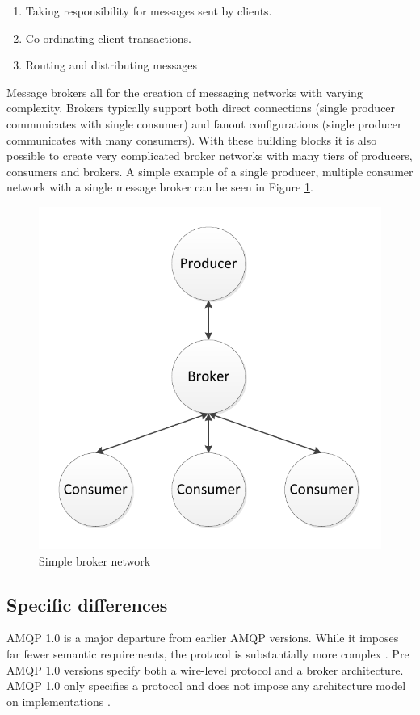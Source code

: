 \documentclass{thesis}
\begin{document}
\begin{enumerate}
\item Taking responsibility for messages sent by clients.
\item Co-ordinating client transactions.
\item Routing and distributing messages 
\end{enumerate}

Message brokers all for the creation of messaging networks with varying complexity.  Brokers typically support both direct connections (single producer communicates with single consumer) and fanout configurations (single producer communicates with many consumers).  With these building blocks it is also possible to create very complicated broker networks with many tiers of producers, consumers and brokers.  A simple example of a single producer, multiple consumer network with a single message broker can be seen in Figure \ref{fig:simple-fanout}.

\begin{figure}[ht]
\centering
\includegraphics[scale=.75]{simple_fanout}  
\caption{Simple broker network}
\label{fig:simple-fanout}
\end{figure}

\subsection {Specific differences}
AMQP 1.0 is a major departure from earlier AMQP versions.  While it imposes far fewer semantic requirements, the protocol is substantially more complex \cite{RABBITMQ_PROTOCOLS}.  Pre AMQP 1.0 versions specify both a  wire-level protocol and a broker architecture.  AMQP 1.0 only specifies a protocol and does not impose any architecture model on implementations \cite{REDHAT1}.
\end{document}
